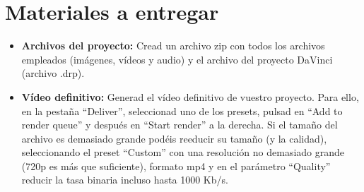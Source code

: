 \documentclass[es,practica]{uah}
\begin{document}
\section{Materiales a entregar}

\begin{itemize}
	\item {\bf Archivos del proyecto: }Cread un archivo zip con todos los archivos empleados (imágenes, vídeos y audio) y el archivo del proyecto DaVinci (archivo .drp).
	\item {\bf Vídeo definitivo: } Generad el vídeo definitivo de vuestro proyecto. Para ello, en la pestaña ``Deliver'', seleccionad uno de los presets, pulsad en ``Add to render queue'' y después en ``Start render'' a la derecha. Si el tamaño del archivo es demasiado grande podéis reeducir su tamaño (y la calidad), seleccionando el preset ``Custom'' con una resolución no demasiado grande (720p es más que suficiente), formato mp4 y en el parámetro ``Quality'' reducir la tasa binaria incluso hasta 1000 Kb/s.
\end{itemize}
\end{document}
